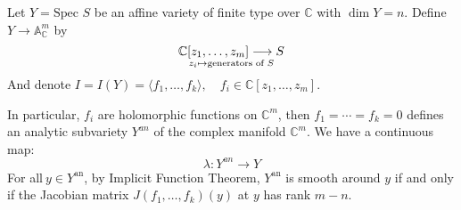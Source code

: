 \documentclass[openany]{book}
\theoremstyle{definition} %
\theoremstyle{remark}
\begin{document}
\quad

Let $Y = \text{Spec } S$ be an affine variety of finite type over $\mathbb{C}$ with $\dim Y = n$. Define $Y \longrightarrow \mathbb{A}^{m}_{\mathbb{C}}$ by $$ \mathbb{C}[z_1, \ldots, z_m] \longrightarrow S\atop  z_i \mapsto \text{generators of } S$$And denote $I = I(Y) = \langle f_1, \ldots, f_k \rangle, \quad f_i \in \mathbb{C}[z_1, \ldots, z_m]$.

In particular, $f_i$ are holomorphic functions on $\mathbb{C}^m$, then $f_1 = \cdots = f_k = 0$ defines an analytic subvariety $Y^{an}$ of the complex manifold $\mathbb{C}^m$. We have a continuous map: $$ \lambda: Y^{an} \longrightarrow Y $$For all$\ y \in Y^{\text{an}}$, by Implicit Function Theorem, $Y^{\text{an}}$ is smooth around $y$ if and only if the Jacobian matrix $J(f_1, \ldots, f_k)(y)$ at $y$ has rank $m-n$.
\end{document}
